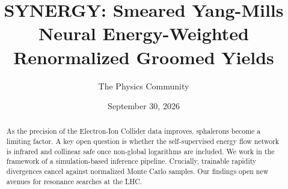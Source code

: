 \documentclass[11pt]{article}
\title{SYNERGY: Smeared Yang-Mills Neural Energy-Weighted Renormalized Groomed Yields}
\author{The Physics Community}
\date{September 30, 2026}
\numberwithin{equation}{section}
\theoremstyle{definition}
\theoremstyle{remark}
\begin{document}
\maketitle
\begin{abstract}
As the precision of the Electron-Ion Collider data improves, sphalerons
become a limiting factor. A key open question is whether the
self-supervised energy flow network is infrared and collinear safe once
non-global logarithms are included. We work in the framework of a
simulation-based inference pipeline. Crucially, trainable rapidity
divergences cancel against normalized Monte Carlo samples. Our findings
open new avenues for resonance searches at the LHC.
\end{abstract}
\tableofcontents



\nocite{*}


\end{document}
